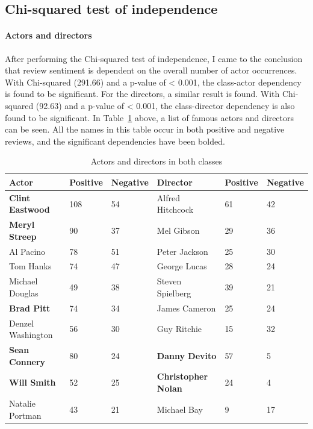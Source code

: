 \documentclass[
10pt, %
a4paper, %
oneside, %
headinclude,footinclude, %
] {book}%
\begin{document}
\subsection{Chi-squared test of independence}

\paragraph{Actors and directors}

After performing the Chi-squared test of independence, I came to the conclusion that review sentiment is dependent on the overall number of actor occurrences. With Chi-squared (291.66) and a p-value of < 0.001, the class-actor dependency is found to be significant. For the directors, a similar result is found. With Chi-squared (92.63) and a p-value of < 0.001, the class-director dependency is also found to be significant. In Table~\ref{Table 3} above, a list of famous actors and directors can be seen. All the names in this table occur in both positive and negative reviews, and the significant dependencies have been bolded.

\begin{table}[]
\centering
\caption{Actors and directors in both classes}
\label{Table 3}
\begin{tabular}{llllll}
\toprule
Actor             & Positive & Negative & Director          & Positive & Negative \\ \midrule
\textbf{Clint Eastwood}    & 108      & 54       & Alfred Hitchcock  & 61       & 42       \\
\textbf{Meryl Streep}      & 90       & 37       & Mel Gibson        & 29       & 36       \\
Al Pacino         & 78       & 51       & Peter Jackson     & 25       & 30       \\
Tom Hanks         & 74       & 47       & George Lucas      & 28       & 24       \\
Michael Douglas   & 49       & 38       & Steven Spielberg  & 39       & 21       \\
\textbf{Brad Pitt}         & 74       & 34       & James Cameron     & 25       & 24       \\
Denzel Washington & 56       & 30       & Guy Ritchie       & 15       & 32       \\
\textbf{Sean Connery}      & 80       & 24       & \textbf{Danny Devito}      & 57       & 5        \\
\textbf{Will Smith}        & 52       & 25      & \textbf{Christopher Nolan} & 24       & 4       \\
Natalie Portman   & 43       & 21       & Michael Bay       & 9        & 17       \\ \bottomrule
\end{tabular}
\end{table}
\end{document}
